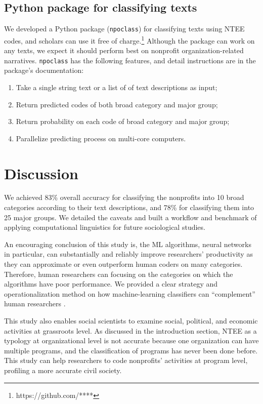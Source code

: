 \documentclass[11pt]{article}
\begin{document}
\subsection{Python package for classifying texts}

We developed a Python package (\texttt{npoclass}) for classifying texts using NTEE codes, and scholars can use it free of charge.\footnote{https://github.com/****} Although the package can work on any texts, we expect it should perform best on nonprofit organization-related narratives. \texttt{npoclass} has the following features, and detail instructions are in the package's documentation:

\begin{enumerate}[nosep]
	\item Take a single string text or a list of of text descriptions as input;
	\item Return predicted codes of both broad category and major group;
	\item Return probability on each code of broad category and major group;
	\item Parallelize predicting process on multi-core computers.
\end{enumerate}


\section{Discussion}

We achieved 83\% overall accuracy for classifying the nonprofits into 10 broad categories according to their text descriptions, and 78\% for classifying them into 25 major groups. We detailed the caveats and built a workflow and benchmark of applying computational linguistics for future sociological studies. 

An encouraging conclusion of this study is, the ML algorithms, neural networks in particular, can substantially and reliably improve researchers' productivity as they can approximate or even outperform human coders on many categories. Therefore, human researchers can focusing on the categories on which the algorithms have poor performance. We provided a clear strategy and operationalization method on how machine-learning classifiers can ``complement'' human researchers \parencite[25]{NelsonFutureCodingComparison2018}.

This study also enables social scientists to examine social, political, and economic activities at grassroots level. As discussed in the introduction section, NTEE as a typology at organizational level is not accurate because one organization can have multiple programs, and the classification of programs has never been done before. This study can help researchers to code nonprofits' activities at program level, profiling a more accurate civil society.
\end{document}
